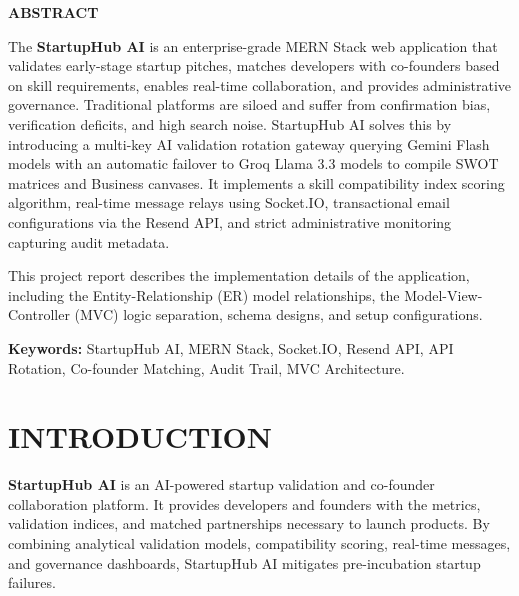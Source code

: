 \documentclass[12pt,a4paper]{report}
\begin{document}
\newpage
\thispagestyle{empty}
\begin{center}
    \large
    \textbf{ABSTRACT}
\end{center}
\vspace{1cm}
The \textbf{StartupHub AI} is an enterprise-grade MERN Stack web application that validates early-stage startup pitches, matches developers with co-founders based on skill requirements, enables real-time collaboration, and provides administrative governance. Traditional platforms are siloed and suffer from confirmation bias, verification deficits, and high search noise. StartupHub AI solves this by introducing a multi-key AI validation rotation gateway querying Gemini Flash models with an automatic failover to Groq Llama 3.3 models to compile SWOT matrices and Business canvases. It implements a skill compatibility index scoring algorithm, real-time message relays using Socket.IO, transactional email configurations via the Resend API, and strict administrative monitoring capturing audit metadata.

This project report describes the implementation details of the application, including the Entity-Relationship (ER) model relationships, the Model-View-Controller (MVC) logic separation, schema designs, and setup configurations.

\vspace{1cm}
\noindent
\textbf{Keywords:} StartupHub AI, MERN Stack, Socket.IO, Resend API, API Rotation, Co-founder Matching, Audit Trail, MVC Architecture.

\newpage
\tableofcontents

\chapter{INTRODUCTION}
\textbf{StartupHub AI} is an AI-powered startup validation and co-founder collaboration platform. It provides developers and founders with the metrics, validation indices, and matched partnerships necessary to launch products. By combining analytical validation models, compatibility scoring, real-time messages, and governance dashboards, StartupHub AI mitigates pre-incubation startup failures.
\end{document}
